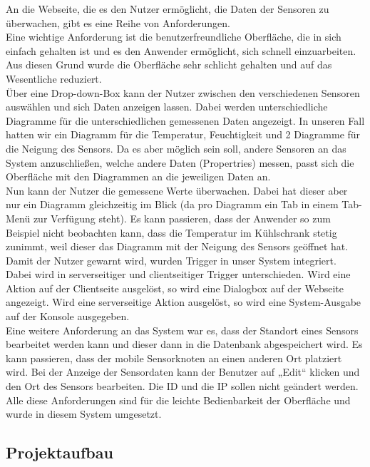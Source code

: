 \documentclass[12pt,a4paper,twoside]{article}
\begin{document}
An die Webseite, die es den Nutzer ermöglicht, die Daten der Sensoren zu überwachen, gibt es eine Reihe von Anforderungen. \\
Eine wichtige Anforderung ist die benutzerfreundliche Oberfläche, die in sich einfach gehalten ist und es den Anwender ermöglicht, sich schnell einzuarbeiten. Aus diesen Grund wurde die Oberfläche sehr schlicht gehalten und auf das Wesentliche reduziert.\\
Über eine Drop-down-Box kann der Nutzer zwischen den verschiedenen Sensoren auswählen und sich Daten anzeigen lassen. Dabei werden unterschiedliche Diagramme für die unterschiedlichen gemessenen Daten angezeigt. In unseren Fall hatten wir ein Diagramm für die Temperatur, Feuchtigkeit und 2 Diagramme für die Neigung des Sensors. Da es aber möglich sein soll, andere Sensoren an das System anzuschließen, welche andere Daten (Propertries) messen, passt sich die Oberfläche mit den Diagrammen an die jeweiligen Daten an.\\
Nun kann der Nutzer die gemessene Werte überwachen. Dabei hat dieser aber nur ein Diagramm gleichzeitig im Blick (da pro Diagramm ein Tab in einem Tab-Menü zur Verfügung steht). Es kann passieren, dass der Anwender so zum Beispiel nicht beobachten kann, dass die Temperatur im Kühlschrank stetig zunimmt, weil dieser das Diagramm mit der Neigung des Sensors geöffnet hat. Damit der Nutzer gewarnt wird, wurden Trigger in unser System integriert. Dabei wird in serverseitiger und clientseitiger Trigger unterschieden. Wird eine Aktion auf der Clientseite ausgelöst, so wird eine Dialogbox auf der Webseite angezeigt. Wird eine serverseitige Aktion ausgelöst, so wird eine System-Ausgabe auf der Konsole ausgegeben.\\
Eine weitere Anforderung an das System war es, dass der Standort eines Sensors bearbeitet werden kann und dieser dann in die Datenbank abgespeichert wird. Es kann passieren, dass der mobile Sensorknoten an einen anderen Ort platziert wird. Bei der Anzeige der Sensordaten kann der Benutzer auf „Edit“ klicken und den Ort des Sensors bearbeiten. Die ID und die IP sollen nicht geändert werden. \\
Alle diese Anforderungen sind für die leichte Bedienbarkeit der Oberfläche und wurde in diesem System umgesetzt.

\subsection{Projektaufbau}
\end{document}
